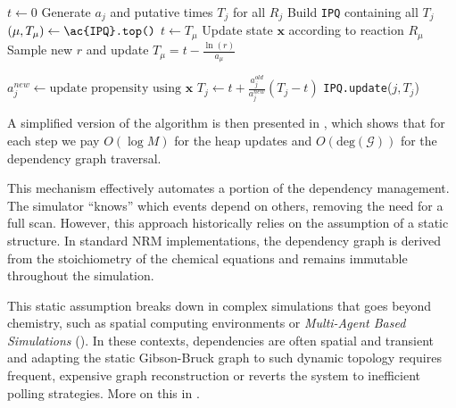 \begin{algorithm}
	\caption{Next Reaction Method (Gibson-Bruck)}\label{alg:gibson_bruck}
	\begin{algorithmic}[1]
		\State $t \gets 0$
		\State Generate $a_j$ and putative times $T_j$ for all $R_j$ 
		\State Build \texttt{\ac{IPQ}} containing all $T_j$
		\State $(\mu, T_{\mu}) \gets \texttt{\ac{IPQ}.top()}$ 
		\State $t \gets T_{\mu}$ 
		\State Update state $\mathbf{x}$ according to reaction $R_{\mu}$
		\State Sample new $r$ and update $T_{\mu} = t - \frac{\ln(r)}{a_{\mu}}$ 

		\State $a_j^{new} \gets \text{update propensity using } \mathbf{x}$
		\State $T_j \gets t + \frac{a_j^{old}}{a_j^{new}}(T_j - t)$ 
		\State \texttt{\ac{IPQ}.update}($j, T_j$) 
		\EndIf
		\EndFor
		\EndWhile
		\EndProcedure
	\end{algorithmic}
\end{algorithm}

A simplified version of the algorithm is then presented in
, which shows that for each step we pay $O(\log M)$ for
the heap updates and $O(\text{deg}(\mathcal{G}))$ for the dependency graph
traversal.

This mechanism effectively automates a portion of the dependency management.
The simulator ``knows'' which events depend on others, removing the need for a
full scan. However, this approach historically relies on the assumption of a
static structure. In standard NRM implementations, the dependency graph is
derived from the stoichiometry of the chemical equations and remains immutable
throughout the simulation.

This static assumption breaks down in complex simulations that goes beyond
chemistry, such as spatial computing environments or \emph{Multi-Agent Based
Simulations} (). In these contexts, dependencies are often
spatial and transient and adapting the static Gibson-Bruck graph to such
dynamic topology requires frequent, expensive graph reconstruction or reverts
the system to inefficient polling strategies. More on this in
.

